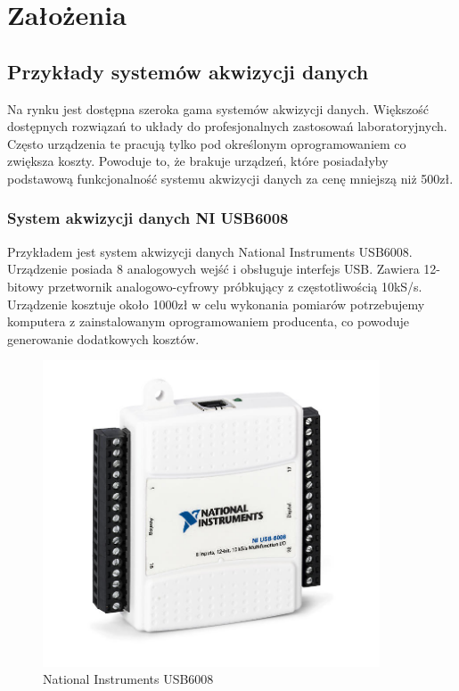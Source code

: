 \chapter{Założenia}

\label{ch:zalozenia}

\section{Przykłady systemów akwizycji danych}

Na rynku jest dostępna szeroka gama systemów akwizycji danych. Większość dostępnych rozwiązań to układy do profesjonalnych zastosowań laboratoryjnych. Często urządzenia te pracują tylko pod określonym oprogramowaniem co zwiększa koszty. Powoduje to, że brakuje urządzeń, które posiadałyby podstawową funkcjonalność systemu akwizycji danych za cenę mniejszą niż 500zł. 

\subsection{System akwizycji danych NI USB6008}

Przykładem jest system akwizycji danych National Instruments USB6008. Urządzenie posiada 8 analogowych wejść i obsługuje interfejs USB. Zawiera 12-bitowy przetwornik analogowo-cyfrowy próbkujący z częstotliwością 10kS/s.\cite{NI_6008} Urządzenie kosztuje około 1000zł w celu wykonania pomiarów potrzebujemy komputera z zainstalowanym oprogramowaniem producenta, co powoduje generowanie dodatkowych kosztów.

\begin{figure}[h]
	\centering
		\includegraphics[width=10cm]{daq_ni_usb6008}
	\caption{National Instruments USB6008} 
	\label{fig:uxtouch}
\end{figure}

